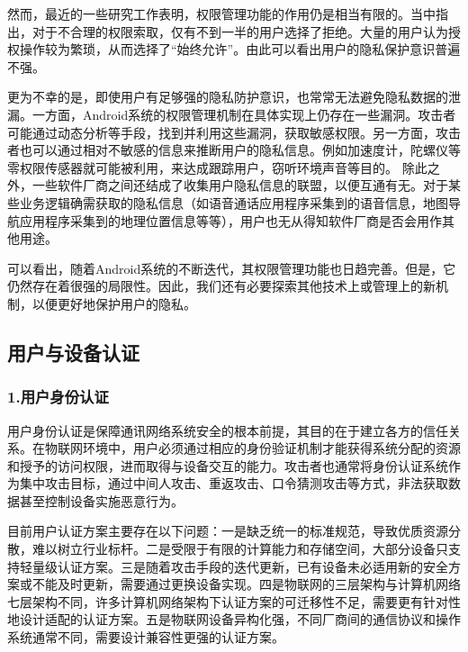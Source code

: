 然而，最近的一些研究工作表明，权限管理功能的作用仍是相当有限的。\cite{userbehavior}当中指出，对于不合理的权限索取，仅有不到一半的用户选择了拒绝。大量的用户认为授权操作较为繁琐，从而选择了``始终允许''。由此可以看出用户的隐私保护意识普遍不强。

更为不幸的是，即使用户有足够强的隐私防护意识，也常常无法避免隐私数据的泄漏。一方面，Android系统的权限管理机制在具体实现上仍存在一些漏洞。攻击者可能通过动态分析等手段\cite{escalation}，找到并利用这些漏洞，获取敏感权限。另一方面，攻击者也可以通过相对不敏感的信息来推断用户的隐私信息。例如加速度计，陀螺仪等零权限传感器就可能被利用，来达成跟踪用户，窃听环境声音等目的\cite{sensorid,eavesdrop}。
除此之外，一些软件厂商之间还结成了收集用户隐私信息的联盟，以便互通有无。对于某些业务逻辑确需获取的隐私信息（如语音通话应用程序采集到的语音信息，地图导航应用程序采集到的地理位置信息等等），用户也无从得知软件厂商是否会用作其他用途。

可以看出，随着Android系统的不断迭代，其权限管理功能也日趋完善。但是，它仍然存在着很强的局限性。因此，我们还有必要探索其他技术上或管理上的新机制，以便更好地保护用户的隐私。

\subsection{用户与设备认证}
\label{common_security}

\subsubsection{\textcolor{myblue}{\textbf{1.用户身份认证}}}


用户身份认证是保障通讯网络系统安全的根本前提，其目的在于建立各方的信任关系。在物联网环境中，用户必须通过相应的身份验证机制才能获得系统分配的资源和授予的访问权限，进而取得与设备交互的能力。攻击者也通常将身份认证系统作为集中攻击目标，通过中间人攻击、重返攻击、口令猜测攻击等方式，非法获取数据甚至控制设备实施恶意行为。

目前用户认证方案主要存在以下问题：一是缺乏统一的标准规范，导致优质资源分散，难以树立行业标杆。二是受限于有限的计算能力和存储空间，大部分设备只支持轻量级认证方案。三是随着攻击手段的迭代更新，已有设备未必适用新的安全方案或不能及时更新，需要通过更换设备实现。四是物联网的三层架构与计算机网络七层架构不同，许多计算机网络架构下认证方案的可迁移性不足，需要更有针对性地设计适配的认证方案。五是物联网设备异构化强，不同厂商间的通信协议和操作系统通常不同，需要设计兼容性更强的认证方案。

